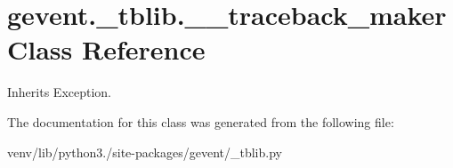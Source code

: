 \hypertarget{classgevent_1_1__tblib_1_1____traceback__maker}{}\section{gevent.\+\_\+tblib.\+\_\+\+\_\+traceback\+\_\+maker Class Reference}
\label{classgevent_1_1__tblib_1_1____traceback__maker}


Inherits Exception.



The documentation for this class was generated from the following file\+:\begin{DoxyCompactItemize}
\item 
venv/lib/python3./site-\/packages/gevent/\+\_\+tblib.\+py\end{DoxyCompactItemize}

